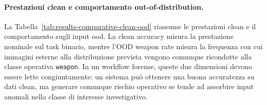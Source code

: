 \paragraph{Prestazioni clean e comportamento out-of-distribution.}

La Tabella~\ref{tab:results-comparative-clean-ood} riassume le prestazioni clean
e il comportamento sugli input \gls{ood}. La clean accuracy misura la prestazione
nominale sul task binario, mentre l'OOD weapon rate misura la frequenza con cui
immagini esterne alla distribuzione prevista vengono comunque ricondotte alla
classe operativa \texttt{weapon}. In un workflow forense, queste due dimensioni
devono essere lette congiuntamente: un sistema può ottenere una buona accuratezza
su dati clean, ma generare comunque rischio operativo se tende ad assorbire input
anomali nella classe di interesse investigativo.


